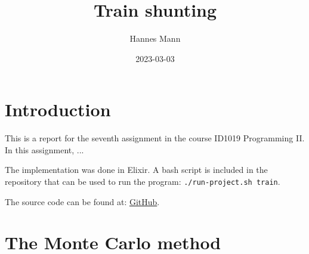 \documentclass[a4paper,11pt]{article}
\begin{document}
\title{
    \textbf{Train shunting}
}
\author{Hannes Mann}
\date{2023-03-03}

\maketitle

\section*{Introduction}

This is a report for the seventh assignment in the course ID1019 Programming II.
In this assignment, ...

The implementation was done in Elixir. A bash script is included in the repository that can be used to run the program: \texttt{./run-project.sh train}.

The source code can be found at: \href{https://github.com/hannesmann/ID1019/tree/main/src/train}{GitHub}.

\section*{The Monte Carlo method}
\end{document}
